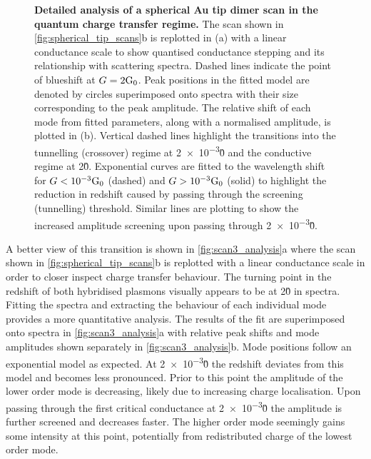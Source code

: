 \documentclass[a4paper]{article}
\begin{document}
\begin{figure}[bt]
\caption[Detailed analysis of a spherical Au tip dimer scan in the quantum charge transfer regime]{\textbf{Detailed analysis of a spherical Au tip dimer scan in the quantum charge transfer regime.} The scan shown in \autoref{fig:spherical_tip_scans}b is replotted in (a) with a linear conductance scale to show quantised conductance stepping and its relationship with scattering spectra. Dashed lines indicate the point of blueshift at $G=2\mathrm{G_{0}}$. Peak positions in the fitted model are denoted by circles superimposed onto spectra with their size corresponding to the peak amplitude. The relative shift of each mode from fitted parameters, along with a normalised amplitude, is plotted in (b). Vertical dashed lines highlight the transitions into the tunnelling (crossover) regime at \num{2e-3}\G0 and the conductive regime at 2\G0. Exponential curves are fitted to the wavelength shift for $G<\num{e-3}\mathrm{G_{0}}$ (dashed) and $G>\num{e-3}\mathrm{G_{0}}$ (solid) to highlight the reduction in redshift caused by passing through the screening (tunnelling) threshold. Similar lines are plotting to show the increased amplitude screening upon passing through \num{2e-3}\G0.}
\label{fig:scan3_analysis}
\vspace{-5pt}
\end{figure}

A better view of this transition is shown in \autoref{fig:scan3_analysis}a where the scan shown in \autoref{fig:spherical_tip_scans}b is replotted with a linear conductance scale in order to closer inspect charge transfer behaviour. The turning point in the redshift of both hybridised plasmons visually appears to be at 2\G0 in spectra. Fitting the spectra and extracting the behaviour of each individual mode provides a more quantitative analysis. The results of the fit are superimposed onto spectra in \autoref{fig:scan3_analysis}a with relative peak shifts and mode amplitudes shown separately in \autoref{fig:scan3_analysis}b. Mode positions follow an exponential model as expected. At \num{2e-3}\G0 the redshift deviates from this model and becomes less pronounced. Prior to this point the amplitude of the lower order mode is decreasing, likely due to increasing charge localisation. Upon passing through the first critical conductance at \num{2e-3}\G0 the amplitude is further screened and decreases faster. The higher order mode seemingly gains some intensity at this point, potentially from redistributed charge of the lowest order mode.
\end{document}
